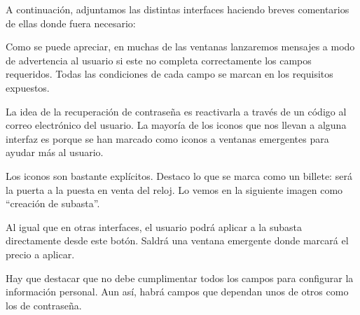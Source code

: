 	A continuación, adjuntamos las distintas interfaces haciendo breves comentarios de ellas donde fuera necesario:


	Como se puede apreciar, en muchas de las ventanas lanzaremos mensajes a modo de advertencia al usuario si este no completa correctamente los campos requeridos. Todas las condiciones de cada campo se marcan en los requisitos expuestos.
	

	La idea de la recuperación de contraseña es reactivarla a través de un código al correo electrónico del usuario. La mayoría de los iconos que nos llevan a alguna interfaz es porque se han marcado como iconos a ventanas emergentes para ayudar más al usuario.
	

	Los iconos son bastante explícitos. Destaco lo que se marca como un billete: será la puerta a la puesta en venta del reloj. Lo vemos en la siguiente imagen como ``creación de subasta''.



	Al igual que en otras interfaces, el usuario podrá aplicar a la subasta directamente desde este botón. Saldrá una ventana emergente donde marcará el precio a aplicar.
	

	Hay que destacar que no debe cumplimentar todos los campos para configurar la información personal. Aun así, habrá campos que dependan unos de otros como los de contraseña.
